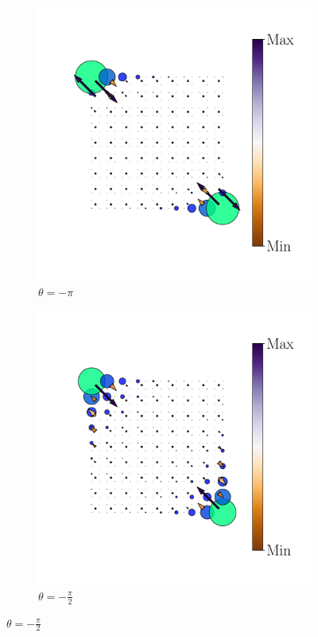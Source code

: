 \begin{figure}[tbh!]
     \centering
    \captionsetup[sub]{font=small}
     \begin{minipage}[h!]{1.0\textwidth}
         \begin{subfigure}[b!]{0.2 \textwidth}
             \caption{$\theta = -\pi$}
             \includegraphics[width=\textwidth]{Imagenes/Resultados_pump_Cuadrado/y/hoti_pomp_y_pos1.pdf}
         \end{subfigure}\hspace*{-0.5em}
          \begin{subfigure}[b!]{0.2 \textwidth}
             \caption*{$\theta = -\frac{\pi}{2}$}
             \includegraphics[width=\textwidth]{Imagenes/Resultados_pump_Cuadrado/y/hoti_pomp_y_pos2.pdf}

\end{subfigure}
\end{minipage}
\end{figure}
